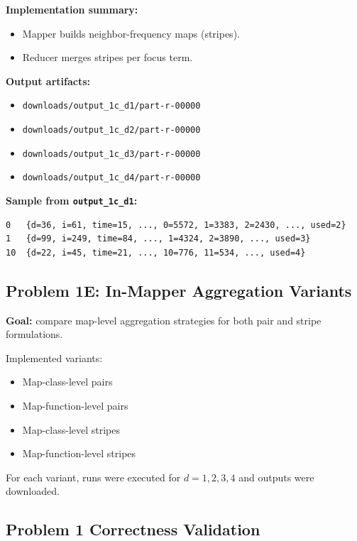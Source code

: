 \documentclass[11pt]{article}
\begin{document}
\textbf{Implementation summary:}
\begin{itemize}[leftmargin=*]
  \item Mapper builds neighbor-frequency maps (stripes).
  \item Reducer merges stripes per focus term.
\end{itemize}

\textbf{Output artifacts:}
\begin{itemize}[leftmargin=*]
  \item \texttt{downloads/output\_1c\_d1/part-r-00000}
  \item \texttt{downloads/output\_1c\_d2/part-r-00000}
  \item \texttt{downloads/output\_1c\_d3/part-r-00000}
  \item \texttt{downloads/output\_1c\_d4/part-r-00000}
\end{itemize}

\textbf{Sample from \texttt{output\_1c\_d1}:}
\begin{lstlisting}
0   {d=36, i=61, time=15, ..., 0=5572, 1=3383, 2=2430, ..., used=2}
1   {d=99, i=249, time=84, ..., 1=4324, 2=3890, ..., used=3}
10  {d=22, i=45, time=21, ..., 10=776, 11=534, ..., used=4}
\end{lstlisting}

\subsection{Problem 1E: In-Mapper Aggregation Variants}
\textbf{Goal:} compare map-level aggregation strategies for both pair and stripe formulations.

Implemented variants:
\begin{itemize}[leftmargin=*]
  \item Map-class-level pairs
  \item Map-function-level pairs
  \item Map-class-level stripes
  \item Map-function-level stripes
\end{itemize}

For each variant, runs were executed for $d=1,2,3,4$ and outputs were downloaded.

\subsection{Problem 1 Correctness Validation}
\end{document}
